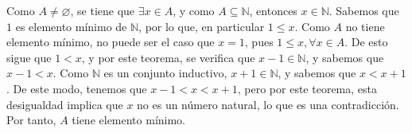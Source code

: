 \documentclass[11pt]{article}
\newcommand{\N}{\mathbb{N}}
\newcommand{\defined}{\coloneqq}
\let\emptyset\varnothing
\let\set\Set
\let\subset\subseteq
\begin{document}
\begin{enumerate}[label=\alph*)]
\begin{enumerate}[label=\roman*)]
        Como $A\neq \emptyset$, se tiene que $\exists x\in A$, y como $A\subset \N$, entonces $x\in \N$. Sabemos que $1$ es elemento mínimo de $\N$, por lo que, en particular $1\leq x$. Como $A$ no tiene elemento mínimo, no puede ser el caso que $x=1$, pues $1\leq x,\forall x\in A$. De esto sigue que $1<x$, y por este teorema, se verifica que $x-1\in \N$, y sabemos que $x-1<x$. Como $\N$ es un conjunto inductivo, $x+1\in \N$, y sabemos que $x<x+1$. De este modo, tenemos que $x-1<x<x+1$, pero por este teorema, esta desigualdad implica que $x$ no es un número natural, lo que es una contradicción. Por tanto, $A$ tiene elemento mínimo.

\end{enumerate}
\end{enumerate}
\end{document}
